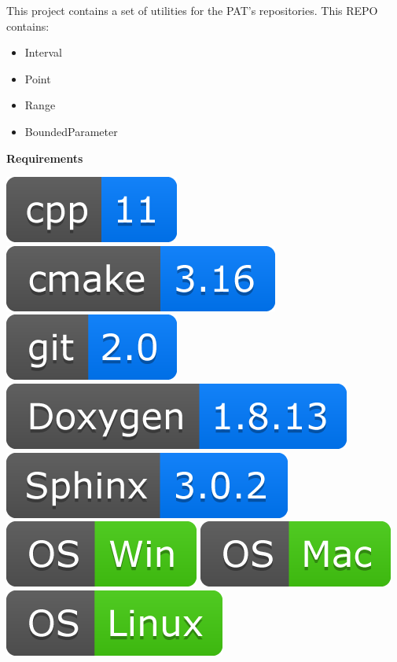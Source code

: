 
This project contains a set of utilities for the PAT's repositories.
This REPO contains:

\begin{itemize}
  \tightlist
  \item
        Interval
  \item
        Point
  \item
        Range
  \item
        BoundedParameter
\end{itemize}

\textbf{Requirements}

\includegraphics[scale=0.7]{img/shilds/cpp.png}
\includegraphics[scale=0.7]{img/shilds/cmake.png}
\includegraphics[scale=0.7]{img/shilds/git.png}
\includegraphics[scale=0.7]{img/shilds/doxygen.png}
\includegraphics[scale=0.7]{img/shilds/sphinx.png}
\includegraphics[scale=0.7]{img/shilds/win.png}
\includegraphics[scale=0.7]{img/shilds/mac.png}
\includegraphics[scale=0.7]{img/shilds/linux.png}

